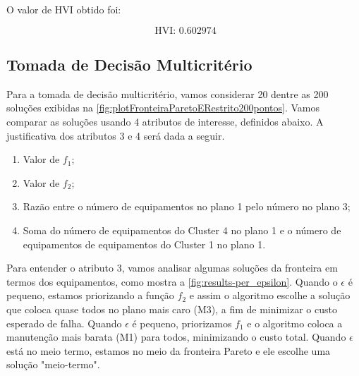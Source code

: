 \documentclass[conference]{IEEEtran}
\newcommand{\un}[1]{\;\text{#1}}
\begin{document}
O valor de HVI obtido foi:

\begin{equation}\label{eq:HVI}
	\un{HVI: }0.602974
\end{equation}

\subsection{Tomada de Decisão Multicritério}

Para a tomada de decisão multicritério, vamos considerar 20 dentre as 200 soluções exibidas na 
\autoref{fig:plotFronteiraParetoERestrito200pontos}. Vamos comparar as soluções usando 4 atributos
de interesse, definidos abaixo. A justificativa dos atributos 3 e 4 será dada a seguir.

\begin{enumerate}
	\item Valor de $f_1$;
	\item Valor de $f_2$;
	\item Razão entre o número de equipamentos no plano 1 pelo número no plano 3;
	\item Soma do número de equipamentos do Cluster 4 no plano 1 e o número de equipamentos 
	de equipamentos do Cluster 1 no plano 1.
\end{enumerate}

Para entender o atributo 3, vamos analisar algumas soluções da fronteira em termos dos equipamentos,
como mostra a \autoref{fig:results-per_epsilon}. Quando o $\epsilon$ é pequeno, estamos 
priorizando a função $f_2$ e assim o algoritmo escolhe a solução que coloca quase 
todos no plano mais caro (M3), a fim de minimizar o custo esperado de falha. Quando $\epsilon$ 
é pequeno, priorizamos $f_1$ e o algoritmo coloca a manutenção mais barata (M1) para todos, 
minimizando o custo total. Quando $\epsilon$ está no meio termo, estamos no meio da fronteira Pareto 
e ele escolhe uma solução "meio-termo".
\end{document}
